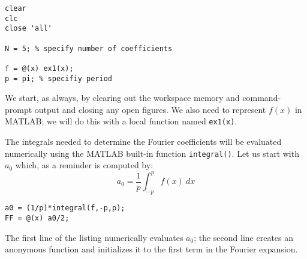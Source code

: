 \begin{lstlisting}[name=lec17-ex1,style=myMatlab]
clear
clc
close 'all'

N = 5; % specify number of coefficients

f = @(x) ex1(x); 
p = pi; % specifiy period
\end{lstlisting}
We start, as always, by clearing out the workspace memory and command-prompt output and closing any open figures.  We also need to represent $f(x)$ in MATLAB; we will do this with a local function named \lstinline{ex1(x)}.  

The integrals needed to determine the Fourier coefficients will be evaluated numerically using the MATLAB built-in function \lstinline{integral()}. Let us start with $a_0$ which, as a reminder is computed by:
\begin{equation*}
a_0 = \frac{1}{p}\int_{-p}^{p} f(x) \ dx
\end{equation*}

\begin{lstlisting}[name=lec17-ex1,style=myMatlab]
a0 = (1/p)*integral(f,-p,p);
FF = @(x) a0/2;
\end{lstlisting}
The first line of the listing numerically evaluates $a_0$; the second line creates an anonymous function and initializes it to the first term in the Fourier expansion.

